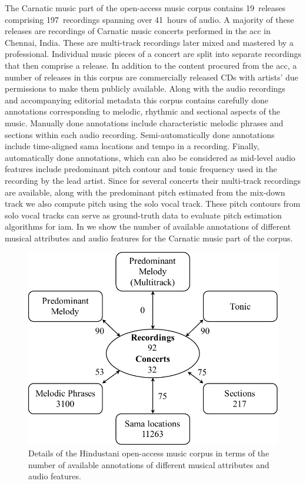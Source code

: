 The Carnatic music part of the open-access music corpus contains 19~releases comprising 197~recordings spanning over 41~hours of audio. A majority of these releases are recordings of Carnatic music concerts performed in the \gls{acc} in Chennai, India. These are multi-track recordings later mixed and mastered by a professional. Individual music pieces of a concert are split into separate recordings that then comprise a release. In addition to the content procured from the \gls{acc}, a number of releases in this corpus are commercially released CDs with artists' due permissions to make them publicly available. Along with the audio recordings and accompanying editorial metadata this corpus contains carefully done annotations corresponding to melodic, rhythmic and sectional aspects of the music. Manually done annotations include characteristic melodic phrases and sections within each audio recording. Semi-automatically done annotations include time-aligned sama locations and tempo in a recording. Finally, automatically done annotations, which can also be considered as mid-level audio features include predominant pitch contour and tonic frequency used in the recording by the lead artist. Since for several concerts their multi-track recordings are available, along with the predominant pitch estimated from the mix-down track we also compute pitch using the solo vocal track. These pitch contours from solo vocal tracks can serve as ground-truth data to evaluate pitch estimation algorithms for \gls{iam}. In  we show the number of available annotations of different musical attributes and audio features for the Carnatic music part of the corpus.


\begin{figure}
	\begin{center}
		\includegraphics[width=\figSizeSeventyFive]{ch04_datasets/figures/hindustani_CC_details.pdf}
	\end{center}
	\caption[Details of the Hindustani open-access music corpus]{Details of the Hindustani open-access music corpus in terms of the number of available annotations of different musical attributes and audio features.}
	\label{fig:hindustani_open_access_corpus_details}
\end{figure}

